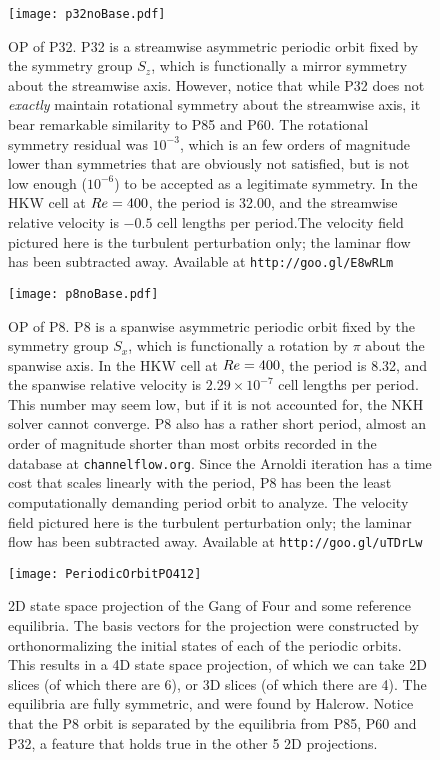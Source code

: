 \begin{figure}
\centerline{\texttt{[image: p32noBase.pdf]}}
\caption{OP of P32. P32 is a streamwise asymmetric periodic orbit fixed by the symmetry group $S_z$, which is functionally a mirror symmetry about the streamwise axis. However, notice that while P32 does not \emph{exactly} maintain rotational symmetry about the streamwise axis, it bear remarkable similarity to P85 and P60. The rotational symmetry residual was $10^{-3}$, which is an few orders of magnitude lower than symmetries that are obviously not satisfied, but is not low enough ($10^{-6}$) to be accepted as a legitimate symmetry.  In the HKW cell at $Re=400$, the period is 32.00, and the streamwise relative velocity is $-0.5$ cell lengths per period.The velocity field pictured here is the turbulent perturbation only; the laminar flow has been subtracted away. Available at {\tt http://goo.gl/E8wRLm}}\label{fig:p32}
\end{figure}


\begin{figure}
\centerline{\texttt{[image: p8noBase.pdf]}}
\caption{OP of P8. P8 is a spanwise asymmetric periodic orbit fixed by the symmetry group $S_x$, which is functionally a rotation by $\pi$ about the spanwise axis. In the HKW cell at $Re = 400$, the period is 8.32, and the spanwise relative velocity is $2.29\times 10^{-7}$ cell lengths per period. This number may seem low, but if it is not accounted for, the NKH solver cannot converge. P8 also has a rather short period, almost an order of magnitude shorter than most orbits recorded in the database at {\tt channelflow.org}. Since the Arnoldi iteration has a time cost that scales linearly with the period, P8 has been the least computationally demanding period orbit to analyze. The velocity field pictured here is the turbulent perturbation only; the laminar flow has been subtracted away. Available at {\tt http://goo.gl/uTDrLw}}\label{fig:p8}
\end{figure}



\begin{figure}[h]
\texttt{[image: PeriodicOrbitPO412]}
\caption{2D state space projection of the Gang of Four and some reference equilibria. The basis vectors for the projection were constructed by orthonormalizing the initial states of each of the periodic orbits. This results in a 4D state space projection, of which we can take 2D slices (of which there are 6), or 3D slices (of which there are 4). The equilibria are fully symmetric, and were found by Halcrow. Notice that the P8 orbit is separated by the equilibria from P85, P60 and P32, a feature that holds true in the other 5 2D projections.}\label{fig:POStateSpace}
\end{figure}

